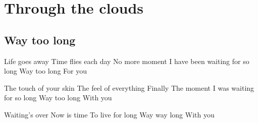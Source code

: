 \documentclass{article}
\newenvironment{album}[1]%
{%
  \section*{#1}
}%
{%
}
\newenvironment{song}[1]%
{%
  \subsection*{\textbf{#1}}
  \begin{multicols*}{2}
}%
{%
  \end{multicols*}
  \newpage
}
\newenvironment{couplet} %
{%
  \verbatim
}%
{% end code
  \endverbatim
}
\newenvironment{pont} %
{%
  \verbatim
}%
{% end code
  \endverbatim
}
\begin{document}
\begin{album}{Through the clouds}
\begin{song}{Way too long}
\begin{couplet}
Life goes away
Time flies each day
No more moment
I have been waiting for so long
Way too long
For you
\end{couplet}  
\begin{couplet}
The touch of your skin
The feel of everything
Finally
The moment I was waiting for so long
Way too long
With you
\end{couplet}
\begin{pont}
Waiting’s over
Now is time
To live for long
Way way long
With you
\end{pont}
\end{song}


\end{album}
\end{document}
